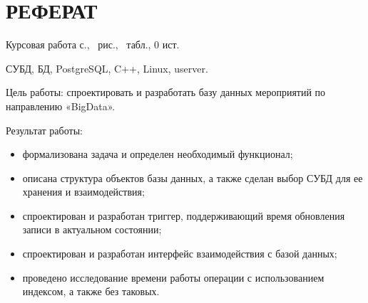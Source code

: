 \section*{РЕФЕРАТ}

Курсовая работа \pageref{LastPage} с., \totalfigures\ рис., \totaltables\ табл., 0 ист.

СУБД, БД, PostgreSQL, C++, Linux, userver.

Цель работы: спроектировать и разработать базу данных мероприятий по направлению «BigData».

Результат работы: 
\begin{itemize}[label=---]
	\item формализована задача и определен необходимый функционал;
	\item описана структура объектов базы данных, а также сделан выбор СУБД для ее хранения и взаимодействия;
	\item спроектирован и разработан триггер, поддерживающий время обновления записи в актуальном состоянии;
	\item спроектирован и разработан интерфейс взаимодействия с базой данных;
	\item проведено исследование времени работы операции с использованием индексом, а также без таковых.
\end{itemize}

\pagebreak
